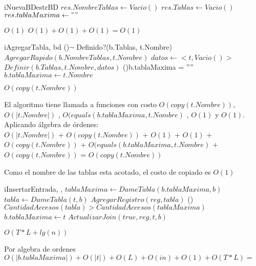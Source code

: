 \begin{Algoritmos}

\begin{algoritmo}{iNuevaBD}{}{estrBD}
	$res.NombreTablas \gets Vacio()$ 
  	$res.Tablas \gets Vacio()$ 
    $res.tablaMaxima \gets "" $ 
    
\end{algoritmo}
\datosAlgoritmo{} %
{} %
{} %
{$O(1)$} %
{$O(1) + O(1) + O(1) = O(1) $} %

\begin{algoritmo}{iAgregarTabla}{, }{bd}
	\If(){$\neg$ Definido?(b.Tablas, t.Nombre)}{
    	$AgregarRapido(b.NombreTablas, t.Nombre)$ 
        $datos \gets < t , Vacio() > $ 
        $Definir(b.Tablas, t.Nombre, datos) $ 
        \If(){b.tablaMaxima = $""$}{
            $b.tablaMaxima \gets t.Nombre$ 
        }
    }	 
\end{algoritmo}
\datosAlgoritmo{} %
{} %
{} %
{$O(copy(t.Nombre))$} %
{El algoritmo tiene llamada a funciones con costo $O(copy(t.Nombre))$, $O(|t.Nombre|)$ , $O(equals(b.tablaMaxima, t.Nombre)$ , $O(1)$ y $O(1)$. Aplicando \'algebra de \'ordenes: \\ $O(|t.Nombre|)$ + $O(copy(t.Nombre))$ + $O(1)$ + $O(1)$ + $O(copy(t.Nombre))$ + $O(equals(b.tablaMaxima, t.Nombre)$ + $O(copy(t.Nombre))$ = $O(copy(t.Nombre))$

Como el nombre de las tablas esta acotado, el costo de copiado es $O(1)$} %

\begin{algoritmo}{iInsertarEntrada}{, , }{}
	$tablaMaxima \gets DameTabla(b.tablaMaxima, b)$ 
   	$tabla \gets DameTabla(t, b)$ 
   	$AgregarRegistro(reg, tabla)$ 
    \If(){$CantidadAccesos(tabla) > CantidadAccesos(tablaMaxima)$}{		    	    			$b.tablaMaxima \gets t$ 
    }
	$ActualizarJoin(true, reg,t,b)$ 
\end{algoritmo}
\datosAlgoritmo{} %
{} %
{} %
{$O(T*L + lg(n))$} %
{Por algebra de ordenes
$O(|b.tablaMaxima|) + O(|t|) + O(L) + O(in) + O(1) + O(T*L) =$

}
\end{Algoritmos}
